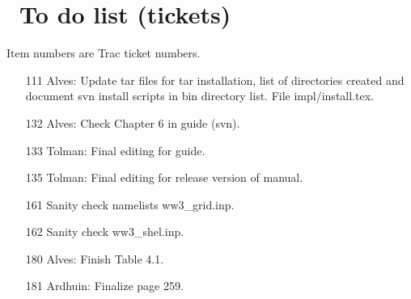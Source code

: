 \pagestyle{myheadings} \setcounter{page}{1} \setcounter{footnote}{0}

\section{~To do list (tickets)} \label{app:to_do}
\newcounters 
\vssub

\noindent
Item numbers are Trac ticket numbers.

\begin{itemize}

\item [111] Alves: Update tar files for tar installation, list of directories
  created and document svn install scripts in bin directory list. File
  impl/install.tex. 

\item [132] Alves: Check Chapter 6 in guide (svn).

\item [133] Tolman: Final editing for guide. 

\item [135] Tolman: Final editing for release version of manual.

\item [161] Sanity check namelists {\file ww3\_grid.inp}.

\item [162] Sanity check {\file ww3\_shel.inp}.

\item [180] Alves: Finish Table 4.1.

\item [181] Ardhuin: Finalize page 259.

\end{itemize}

\bpage
\pagestyle{empty}

